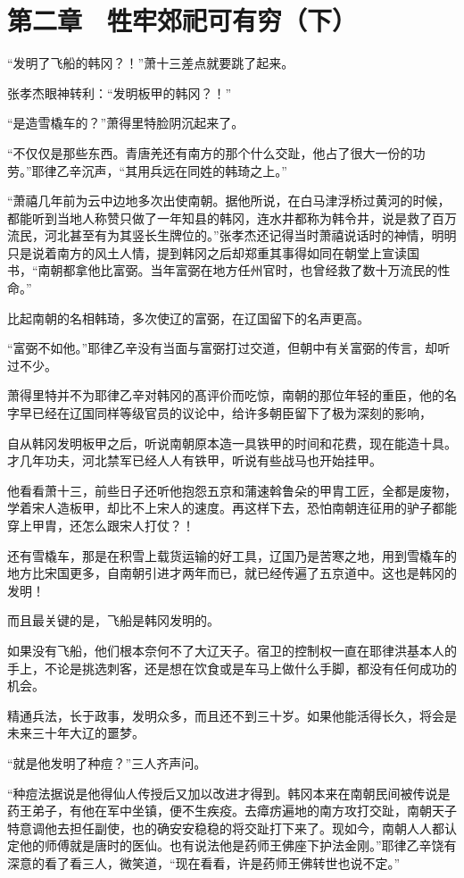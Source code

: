 \section{第二章　牲牢郊祀可有穷（下）}

“发明了飞船的韩冈？！”萧十三差点就要跳了起来。

张孝杰眼神转利：“发明板甲的韩冈？！”

“是造雪橇车的？”萧得里特脸阴沉起来了。

“不仅仅是那些东西。青唐羌还有南方的那个什么交趾，他占了很大一份的功劳。”耶律乙辛沉声，“其用兵远在同姓的韩琦之上。”

“萧禧几年前为云中边地多次出使南朝。据他所说，在白马津浮桥过黄河的时候，都能听到当地人称赞只做了一年知县的韩冈，连水井都称为韩令井，说是救了百万流民，河北甚至有为其竖长生牌位的。”张孝杰还记得当时萧禧说话时的神情，明明只是说着南方的风土人情，提到韩冈之后却郑重其事得如同在朝堂上宣读国书，“南朝都拿他比富弼。当年富弼在地方任州官时，也曾经救了数十万流民的性命。”

比起南朝的名相韩琦，多次使辽的富弼，在辽国留下的名声更高。

“富弼不如他。”耶律乙辛没有当面与富弼打过交道，但朝中有关富弼的传言，却听过不少。

萧得里特并不为耶律乙辛对韩冈的髙评价而吃惊，南朝的那位年轻的重臣，他的名字早已经在辽国同样等级官员的议论中，给许多朝臣留下了极为深刻的影响，

自从韩冈发明板甲之后，听说南朝原本造一具铁甲的时间和花费，现在能造十具。才几年功夫，河北禁军已经人人有铁甲，听说有些战马也开始挂甲。

他看看萧十三，前些日子还听他抱怨五京和蒲速斡鲁朵的甲胄工匠，全都是废物，学着宋人造板甲，却比不上宋人的速度。再这样下去，恐怕南朝连征用的驴子都能穿上甲胄，还怎么跟宋人打仗？！

还有雪橇车，那是在积雪上载货运输的好工具，辽国乃是苦寒之地，用到雪橇车的地方比宋国更多，自南朝引进才两年而已，就已经传遍了五京道中。这也是韩冈的发明！

而且最关键的是，飞船是韩冈发明的。

如果没有飞船，他们根本奈何不了大辽天子。宿卫的控制权一直在耶律洪基本人的手上，不论是挑选刺客，还是想在饮食或是车马上做什么手脚，都没有任何成功的机会。

精通兵法，长于政事，发明众多，而且还不到三十岁。如果他能活得长久，将会是未来三十年大辽的噩梦。

“就是他发明了种痘？”三人齐声问。

“种痘法据说是他得仙人传授后又加以改进才得到。韩冈本来在南朝民间被传说是药王弟子，有他在军中坐镇，便不生疾疫。去瘴疠遍地的南方攻打交趾，南朝天子特意调他去担任副使，也的确安安稳稳的将交趾打下来了。现如今，南朝人人都认定他的师傅就是唐时的医仙。也有说法他是药师王佛座下护法金刚。”耶律乙辛饶有深意的看了看三人，微笑道，“现在看看，许是药师王佛转世也说不定。”

